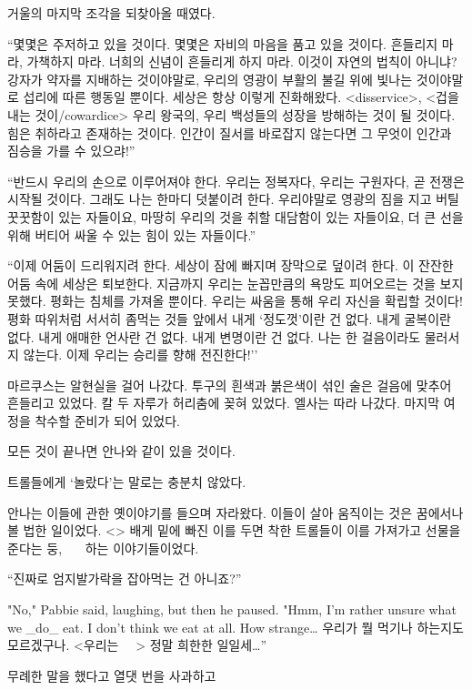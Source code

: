 거울의 마지막 조각을 되찾아올 때였다.

``몇몇은 주저하고 있을 것이다. 몇몇은 자비의 마음을 품고 있을 것이다. 흔들리지 마라, 가책하지 마라. 너희의 신념이 흔들리게 하지 마라. 이것이 자연의 법칙이 아니냐? 강자가 약자를 지배하는 것이야말로, 우리의 영광이 부활의 불길 위에 빛나는 것이야말로 섭리에 따른 행동일 뿐이다. 세상은 항상 이렇게 진화해왔다. <disservice>, <겁을 내는 것이/cowardice> 우리 왕국의, 우리 백성들의 성장을 방해하는 것이 될 것이다. 힘은 취하라고 존재하는 것이다. 인간이 질서를 바로잡지 않는다면 그 무엇이 인간과 짐승을 가를 수 있으랴!''

``반드시 우리의 손으로 이루어져야 한다. 우리는 정복자다, 우리는 구원자다, 곧 전쟁은 시작될 것이다. 그래도 나는 한마디 덧붙이려 한다. 우리야말로 영광의 짐을 지고 버틸 꿋꿋함이 있는 자들이요, 마땅히 우리의 것을 취할 대담함이 있는 자들이요, 더 큰 선을 위해 버티어 싸울 수 있는 힘이 있는 자들이다.''

``이제 어둠이 드리워지려 한다. 세상이 잠에 빠지며 장막으로 덮이려 한다. 이 잔잔한 어둠 속에 세상은 퇴보한다. 지금까지 우리는 눈꼽만큼의 욕망도 피어오르는 것을 보지 못했다. 평화는 침체를 가져올 뿐이다. 우리는 싸움을 통해 우리 자신을 확립할 것이다! 평화 따위처럼 서서히 좀먹는 것들 앞에서 내게 `정도껏'이란 건 없다. 내게 굴복이란 없다. 내게 애매한 언사란 건 없다. 내게 변명이란 건 없다. 나는 한 걸음이라도 물러서지 않는다. 이제 우리는 승리를 향해 전진한다!''

마르쿠스는 알현실을 걸어 나갔다. 투구의 흰색과 붉은색이 섞인 술은 걸음에 맞추어 흔들리고 있었다. 칼 두 자루가 허리춤에 꽂혀 있었다. 엘사는 따라 나갔다. 마지막 여정을 착수할 준비가 되어 있었다.

모든 것이 끝나면 안나와 같이 있을 것이다.

\textbreak

트롤들에게 `놀랐다'는 말로는 충분치 않았다.

안나는 이들에 관한 옛이야기를 들으며 자라왔다. 이들이 살아 움직이는 것은 꿈에서나 볼 법한 일이었다. <> 배게 밑에 빠진 이를 두면 착한 트롤들이 이를 가져가고 선물을 준다는 둥,  ~~~하는 이야기들이었다.

``진짜로 엄지발가락을 잡아먹는 건 아니죠?''

"No," Pabbie said, laughing, but then he paused. "Hmm, I'm rather unsure what we _do_ eat. I don't think we eat at all. How strange… 우리가 뭘 먹기나 하는지도 모르겠구나. <우리는 ~~> 정말 희한한 일일세\ldots''

무례한 말을 했다고 열댓 번을 사과하고 